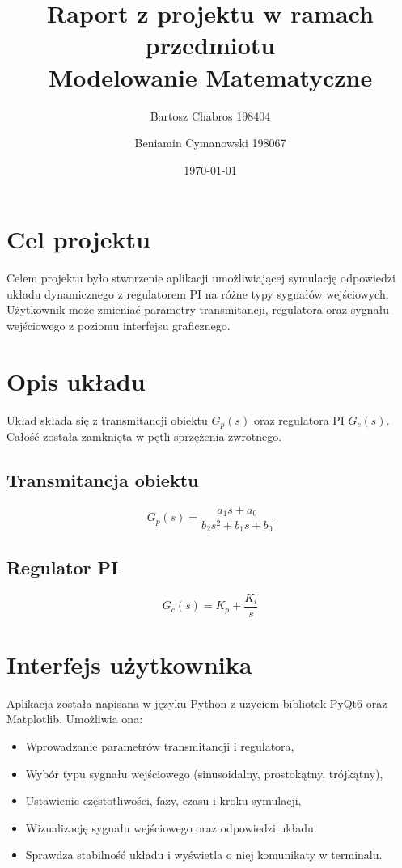 \documentclass[12pt,a4paper]{article}
\title{Raport z projektu w ramach przedmiotu \\ Modelowanie Matematyczne}
\author{Bartosz Chabros 198404 \and Beniamin Cymanowski 198067}
\date{\today}
\begin{document}
\maketitle

\section{Cel projektu}
Celem projektu było stworzenie aplikacji umożliwiającej symulację odpowiedzi układu dynamicznego z regulatorem PI na różne typy sygnałów wejściowych. Użytkownik może zmieniać parametry transmitancji, regulatora oraz sygnału wejściowego z poziomu interfejsu graficznego.

\section{Opis układu}
Układ składa się z transmitancji obiektu $G_p(s)$ oraz regulatora PI $G_c(s)$. Całość została zamknięta w pętli sprzężenia zwrotnego.

\subsection{Transmitancja obiektu}
\[
G_p(s) = \frac{a_1 s + a_0}{b_2 s^2 + b_1 s + b_0}
\]

\subsection{Regulator PI}
\[
G_c(s) = K_p + \frac{K_i}{s}
\]

\section{Interfejs użytkownika}
Aplikacja została napisana w języku Python z użyciem bibliotek PyQt6 oraz Matplotlib. Umożliwia ona:
\begin{itemize}
    \item Wprowadzanie parametrów transmitancji i regulatora,
    \item Wybór typu sygnału wejściowego (sinusoidalny, prostokątny, trójkątny),
    \item Ustawienie częstotliwości, fazy, czasu i kroku symulacji,
    \item Wizualizację sygnału wejściowego oraz odpowiedzi układu.
    \item Sprawdza stabilność układu i wyświetla o niej komunikaty w terminalu.
\end{itemize}
\end{document}
